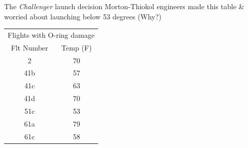 \documentclass[11pt]{beamer}
\begin{document}
\begin{frame}{The \textit{Challenger} launch decision}
Morton-Thiokol engineers made this table \& worried about launching below 53 degrees (Why?)

\begin{scriptsize}
\begin{center}
\begin{tabular}{cc}
\toprule
\multicolumn{2}{c}{Flights with O-ring damage}\\
Flt Number      &       Temp (F)        \\
\midrule
2       &       70      \\
41b     &       57      \\
41c     &       63      \\
41d     &       70      \\
51c     &       53      \\
61a     &       79      \\
61c     &       58      \\
\bottomrule
\end{tabular}
\end{center}
\end{scriptsize}



\end{frame}
\end{document}
